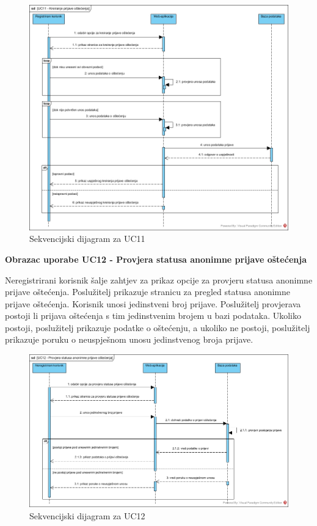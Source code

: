 \begin{figure}[H]
	\includegraphics[scale=0.5]{slike/UC11_sekvencijski.jpg} %
	\centering
	\caption{Sekvencijski dijagram za UC11}
	\label{fig:SekvencijskiDijagramKreiranjePrijaveOštećenja}
\end{figure}

\noindent \textbf{Obrazac uporabe UC12 - Provjera statusa anonimne prijave oštećenja}

Neregistrirani korisnik šalje zahtjev za prikaz opcije za provjeru statusa anonimne prijave oštećenja. Poslužitelj prikazuje stranicu
za pregled statusa anonimne prijave oštećenja. Korisnik unosi jedinstveni broj prijave. Poslužitelj provjerava postoji li prijava oštećenja
s tim jedinstvenim brojem u bazi podataka. Ukoliko postoji, poslužitelj prikazuje podatke o oštećenju, a ukoliko ne postoji, poslužitelj prikazuje
poruku o neuspješnom unosu jedinstvenog broja prijave.


\begin{figure}[H]
	\includegraphics[scale=0.5]{slike/UC12_sekvencijski.jpg} %
	\centering
	\caption{Sekvencijski dijagram za UC12}
	\label{fig:SekvencijskiDijagramKreiranjePrijaveOštećenja}
\end{figure}

